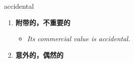 
\begin{frame}
{\huge accidental}
\begin{center}
\begin{enumerate}\Large
  \item \textbf{附带的，不重要的}
  \begin{itemize}
    \item \em{\Large{Its commercial value is accidental.}}
  \end{itemize}
  \item \textbf{意外的，偶然的}
\end{enumerate}
\end{center}
\end{frame}
